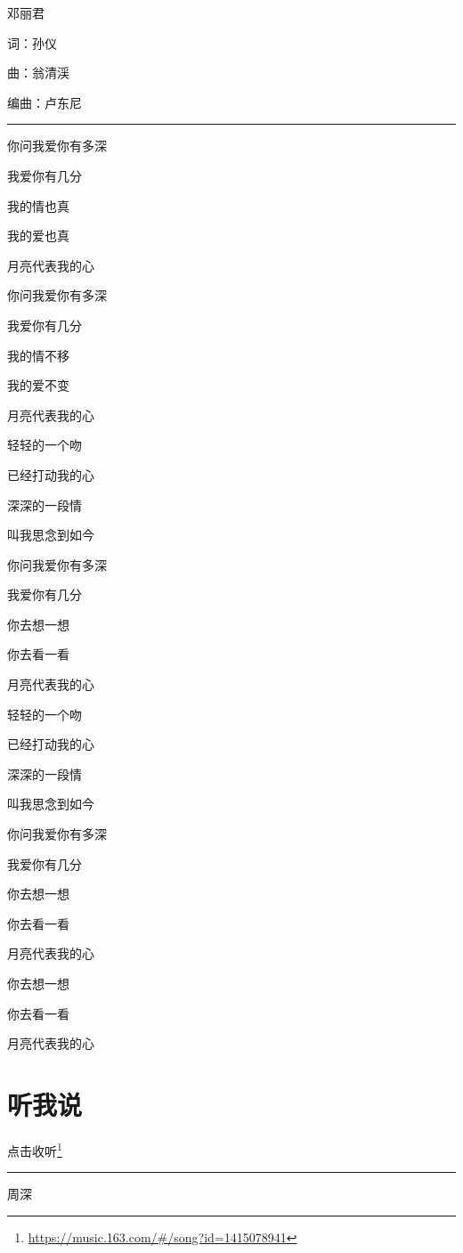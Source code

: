 \documentclass[]{ctexbook}
\renewcommand{\href}[2]{#2\footnote{\url{#1}}}
\begin{document}
邓丽君

词：孙仪

曲：翁清渓

编曲：卢东尼

\begin{center}\rule{0.5\linewidth}{0.5pt}\end{center}

你问我爱你有多深

我爱你有几分

我的情也真

我的爱也真

月亮代表我的心

你问我爱你有多深

我爱你有几分

我的情不移

我的爱不变

月亮代表我的心

轻轻的一个吻

已经打动我的心

深深的一段情

叫我思念到如今

你问我爱你有多深

我爱你有几分

你去想一想

你去看一看

月亮代表我的心

轻轻的一个吻

已经打动我的心

深深的一段情

叫我思念到如今

你问我爱你有多深

我爱你有几分

你去想一想

你去看一看

月亮代表我的心

你去想一想

你去看一看

月亮代表我的心

\section*{听我说}\label{listen-to-me}


\href{https://music.163.com/\#/song?id=1415078941}{点击收听}

\begin{center}\rule{0.5\linewidth}{0.5pt}\end{center}

周深
\end{document}

